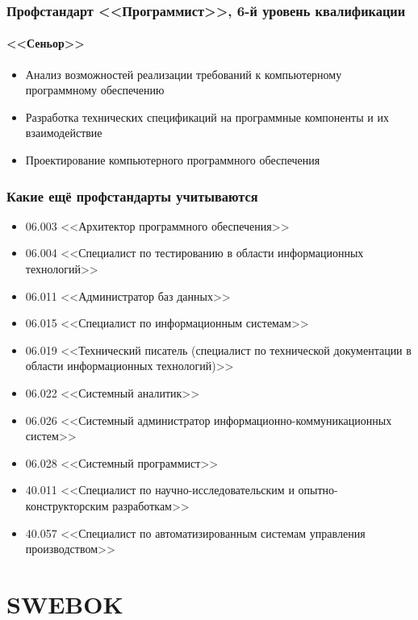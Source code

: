 \documentclass{../../slides-style}
\begin{document}
    \begin{frame}
        \frametitle{Профстандарт <<Программист>>, 6-й уровень квалификации}
        \framesubtitle{<<Сеньор>>}
        \begin{itemize}
            \item Анализ возможностей реализации требований к компьютерному программному обеспечению
            \item Разработка технических спецификаций на программные компоненты и их взаимодействие
            \item Проектирование компьютерного программного обеспечения
        \end{itemize}
    \end{frame}

    \begin{frame}
        \frametitle{Какие ещё профстандарты учитываются}
        \begin{footnotesize}
            \begin{itemize}
                \item 06.003 <<Архитектор программного обеспечения>>
                \item 06.004 <<Специалист по тестированию в области информационных технологий>>
                \item 06.011 <<Администратор баз данных>>
                \item 06.015 <<Специалист по информационным системам>>
                \item 06.019 <<Технический писатель (специалист по технической документации в области информационных технологий)>>
                \item 06.022 <<Системный аналитик>>
                \item 06.026 <<Системный администратор информационно-коммуникационных систем>>
                \item 06.028 <<Системный программист>>
                \item 40.011 <<Специалист по научно-исследовательским и опытно-конструкторским разработкам>>
                \item 40.057 <<Специалист по автоматизированным системам управления производством>>
            \end{itemize}
        \end{footnotesize}
    \end{frame}

    \section{SWEBOK}
\end{document}
